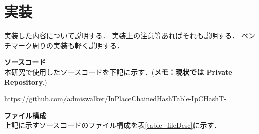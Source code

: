 \chapter{実装}
\label{chap_Implementation}

実装した内容について説明する．
実装上の注意等あればそれも説明する．
ベンチマーク周りの実装も軽く説明する．
\leavevmode \newline

{\bf ソースコード}
\samepage \\ \indent
本研究で使用したソースコードを下記に示す．({\bf \color{red}メモ：現状では Private Repository.})
\begin{center}
  \url{https://github.com/admiswalker/InPlaceChainedHashTable-IpCHashT-}
\end{center}

{\bf ファイル構成}
\samepage \\ \indent
上記に示すソースコードのファイル構成を表\ref{table_fileDesc}に示す．
